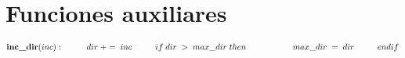 \section{Funciones auxiliares}

\begin{math}
    \textbf{inc\_dir}(inc): \\
        \phantom{---} dir \; += \; inc \\
        \phantom{---} if \; dir \; > \; max\_dir \; then \\
            \phantom{------} max\_dir \; = \; dir \\
        \phantom{---} endif
\end{math}
